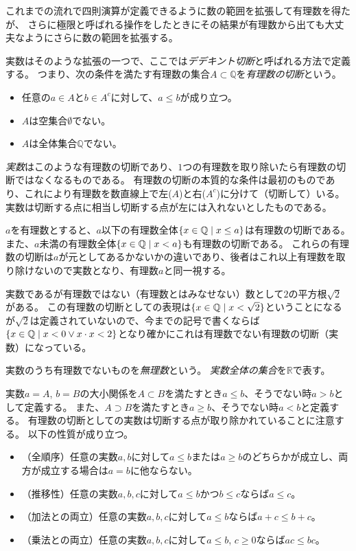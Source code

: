 これまでの流れで四則演算が定義できるように数の範囲を拡張して有理数を得たが、
さらに極限と呼ばれる操作をしたときにその結果が有理数から出ても大丈夫なようにさらに数の範囲を拡張する。

実数はそのような拡張の一つで、ここでは\emph{デデキント切断}と呼ばれる方法で定義する。
つまり、次の条件を満たす有理数の集合$A \subset \mathbb{Q}$を\emph{有理数の切断}という。
\begin{itemize}
\item
任意の$a \in A$と$b \in A^c$に対して、$a \le b$が成り立つ。
\item
$A$は空集合$\emptyset$でない。
\item
$A$は全体集合$\mathbb{Q}$でない。
\end{itemize}
\emph{実数}はこのような有理数の切断であり、$1$つの有理数を取り除いたら有理数の切断ではなくなるものである。
有理数の切断の本質的な条件は最初のものであり、これにより有理数を数直線上で左($A$)と右($A^c$)に分けて（切断して）いる。
実数は切断する点に相当し切断する点が左には入れないとしたものである。

$a$を有理数とすると、$a$以下の有理数全体$\{ x \in \mathbb{Q} \mid x \le a \}$は有理数の切断である。
また、$a$未満の有理数全体$\{ x \in \mathbb{Q} \mid x < a \}$も有理数の切断である。
これらの有理数の切断は$a$が元としてあるかないかの違いであり、後者はこれ以上有理数を取り除けないので実数となり、有理数$a$と同一視する。

\begin{example}
実数であるが有理数ではない（有理数とはみなせない）数として$2$の平方根$\sqrt{2}$がある。
この有理数の切断としての表現は$\{ x \in \mathbb{Q} \mid x < \sqrt{2} \}$ということになるが$\sqrt{2}$は定義されていないので、今までの記号で書くならば$\{ x \in \mathbb{Q} \mid x < 0 \lor x\cdot x < 2 \}$となり確かにこれは有理数でない有理数の切断（実数）になっている。
\end{example}

実数のうち有理数でないものを\emph{無理数}という。
\emph{実数全体の集合}を$\mathbb{R}$で表す。

実数$a = A$, $b = B$の大小関係を$A \subset B$を満たすとき$a \le b$、そうでない時$a > b$として定義する。
また、$A \supset B$を満たすとき$a \ge b$、そうでない時$a < b$と定義する。
有理数の切断としての実数は切断する点が取り除かれていることに注意する。
以下の性質が成り立つ。
\begin{itemize}
\item
（全順序）任意の実数$a, b$に対して$a \le b$または$a \ge b$のどちらかが成立し、両方が成立する場合は$a = b$に他ならない。
\item
（推移性）任意の実数$a, b, c$に対して$a \le b$かつ$b \le c$ならば$a \le c$。
\item
（加法との両立）任意の実数$a, b, c$に対して$a \le b$ならば$a+c \le b+c$。
\item
（乗法との両立）任意の実数$a, b, c$に対して$a \le b$, $c \ge 0$ならば$a c \le b c$。
\end{itemize}

